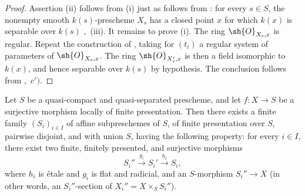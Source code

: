 \begin{proof}
Assertion (ii) follows from (i) just as  follows from : for every $s\in S$, the nonempty smooth $k(s)$-prescheme $X_s$ has a closed point $x$ for which $k(x)$ is separable over $k(s)$ ,~(iii).  It remains to prove (i).  The ring $\sh{O}_{X_s,x}$ is regular.  Repeat the construction of , taking for $(t_i)$ a regular system of parameters of $\sh{O}_{X_s,x}$.  The ring $\sh{O}_{X'_s,x}$ is then a field isomorphic to $k(x)$, and hence separable over $k(s)$ by hypothesis.  The conclusion follows from ,~$c')$.
\end{proof}

\begin{proposition}[17.16.4]
\label{IV.17.16.4}
Let $S$ be a quasi-compact and quasi-separated prescheme, and let $f:X\to S$ be a surjective morphism locally of finite presentation.  Then there exists a finite family $(S_i)_{i\in I}$
of affine subpreschemes of $S$, of finite presentation over $S$, pairwise disjoint, and with union $S$, having the following property: for every $i\in I$, there exist two finite, finitely presented, and surjective morphisms
\[
 S_i''\xrightarrow{g_i}S_i'\xrightarrow{h_i}S_i,
\]
where $h_i$ is \'etale and $g_i$ is flat and radicial, and an $S$-morphism $S_i''\to X$ (in other words, an $S_i''$-section of $X_i''=X\times_SS_i''$).
\end{proposition}

